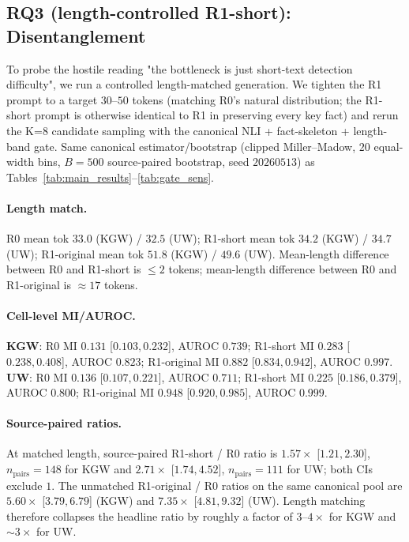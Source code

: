 \documentclass[11pt]{article}
\begin{document}
\subsection{RQ3 (length-controlled R1-short): Disentanglement}
\label{sec:length_disent}

To probe the hostile reading "the bottleneck is just short-text detection
difficulty", we run a controlled length-matched generation. We tighten
the R1 prompt to a target $30$--$50$ tokens (matching R0's natural
distribution; the R1-short prompt is otherwise identical to R1 in
preserving every key fact) and rerun the K=8 candidate sampling with the
canonical NLI + fact-skeleton + length-band gate. Same canonical
estimator/bootstrap (clipped Miller--Madow, $20$ equal-width bins,
$B{=}500$ source-paired bootstrap, seed $20260513$) as Tables~\ref{tab:main_results}--\ref{tab:gate_sens}.

\paragraph{Length match.} R0 mean tok $33.0$ (KGW) / $32.5$ (UW); R1-short
mean tok $34.2$ (KGW) / $34.7$ (UW); R1-original mean tok $51.8$ (KGW) /
$49.6$ (UW). Mean-length difference between R0 and R1-short is $\leq 2$
tokens; mean-length difference between R0 and R1-original is $\approx 17$
tokens.

\paragraph{Cell-level MI/AUROC.}
\textbf{KGW}: R0 MI $0.131$ [$0.103, 0.232$], AUROC $0.739$; R1-short MI
$0.283$ [$0.238, 0.408$], AUROC $0.823$; R1-original MI $0.882$ [$0.834,
0.942$], AUROC $0.997$. \textbf{UW}: R0 MI $0.136$ [$0.107, 0.221$],
AUROC $0.711$; R1-short MI $0.225$ [$0.186, 0.379$], AUROC $0.800$;
R1-original MI $0.948$ [$0.920, 0.985$], AUROC $0.999$.

\paragraph{Source-paired ratios.}
At matched length, source-paired R1-short / R0 ratio is
$1.57\times$ [$1.21, 2.30$], $n_{\mathrm{pairs}}{=}148$ for KGW and
$2.71\times$ [$1.74, 4.52$], $n_{\mathrm{pairs}}{=}111$ for UW;
both CIs exclude $1$. The unmatched R1-original / R0 ratios on the same
canonical pool are $5.60\times$ [$3.79, 6.79$] (KGW) and $7.35\times$
[$4.81, 9.32$] (UW). Length matching therefore collapses the headline
ratio by roughly a factor of $3$--$4\times$ for KGW and $\sim\!3\times$
for UW.
\end{document}
